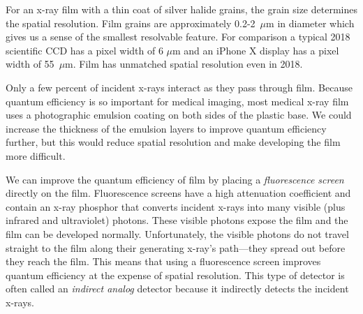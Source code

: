 \documentclass[mphy386-notes.tex]{subfiles}
\begin{document}
For an x-ray film with a thin coat of silver halide grains, the grain size
determines the spatial resolution. Film grains are approximately 0.2-2~$\mu$m in
diameter which gives us a sense of the smallest resolvable feature. For
comparison a typical 2018 scientific CCD has a pixel width of 6 $\mu$m and an
iPhone X display has a pixel width of 55~$\mu$m. Film has unmatched spatial
resolution even in 2018.

Only a few percent of incident x-rays interact as they pass through film.
Because quantum efficiency is so important for medical imaging, most medical
x-ray film uses a photographic emulsion coating on both sides of the plastic
base. We could increase the thickness of the emulsion layers to improve quantum
efficiency further, but this would reduce spatial resolution and make developing
the film more difficult.

We can improve the quantum efficiency of film by placing a \textit{fluorescence
  screen} directly on the film. Fluorescence screens have a high attenuation
coefficient and contain an x-ray phosphor that converts incident x-rays into
many visible (plus infrared and ultraviolet) photons. These visible photons
expose the film and the film can be developed normally. Unfortunately, the
visible photons do not travel straight to the film along their generating
x-ray's path---they spread out before they reach the film. This means that using
a fluorescence screen improves quantum efficiency at the expense of spatial
resolution. This type of detector is often called an \textit{indirect analog}
detector because it indirectly detects the incident x-rays.


\end{document}
